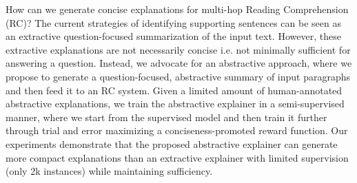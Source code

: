 How can we generate concise explanations for multi-hop Reading Comprehension (RC)? The current strategies of identifying supporting sentences can be seen as an extractive question-focused summarization of the input text. However, these extractive explanations are not necessarily concise i.e. not minimally sufficient for answering a question. Instead, we advocate for an abstractive approach, where we propose to generate a question-focused, abstractive summary of input paragraphs and then feed it to an RC system. Given a limited amount of human-annotated abstractive explanations, we train the abstractive explainer in a semi-supervised manner, where we start from the supervised model and then train it further through trial and error maximizing a conciseness-promoted reward function. Our experiments demonstrate that the proposed abstractive explainer can generate more compact explanations than an extractive explainer with limited supervision (only 2k instances) while maintaining sufficiency.
